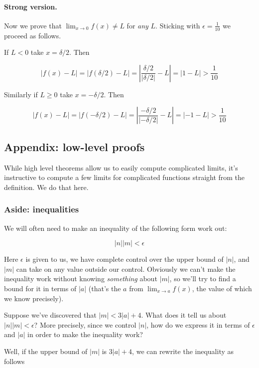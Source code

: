 \paragraph{Strong version.}

Now we prove that $\lim_{x\to 0}f(x)\neq L$ for \textit{any} $L$. Sticking
with $\epsilon=\frac{1}{10}$ we proceed as follows.

\vs

If $L<0$ take $x=\delta/2$. Then

\[|f(x)-L|=|f(\delta/2)-L|=\left|\frac{\delta/2}{|\delta/2|}-L\right|=|1-L|>\frac{1}{10}\]

Similarly if $L\geq 0$ take $x=-\delta/2$. Then

\[|f(x)-L|=|f(-\delta/2)-L|=\left|\frac{-\delta/2}{|-\delta/2|}-L\right|=|-1-L|>\frac{1}{10}\]

\subsection{Appendix: low-level proofs}

While high level theorems allow us to easily compute complicated
limits, it's instructive to compute a few limits for complicated
functions straight from the definition. We do that here.

\subsubsection*{Aside: inequalities}

We will often need to make an inequality of the following form work out:

\[|n||m|<\epsilon\]

Here $\epsilon$ is given to us, we have complete control over the upper bound
of $|n|$, and $|m|$ can take on any value outside our control.
Obviously we can't make the inequality work without knowing
\textit{something} about $|m|$, so we'll try to find a bound for it in
terms of $|a|$ (that's the $a$ from $\lim_{x\to a}f(x)$, the value of
which we know precisely).

\vs

Suppose we've discovered that $|m|<3|a|+4$. What does it tell us about
$|n||m|<\epsilon$? More precisely, since we control $|n|$, how do we express
it in terms of $\epsilon$ and $|a|$ in order to make the inequality work?

\vs

Well, if the upper bound of $|m|$ is $3|a|+4$, we can rewrite the
inequality as follows

